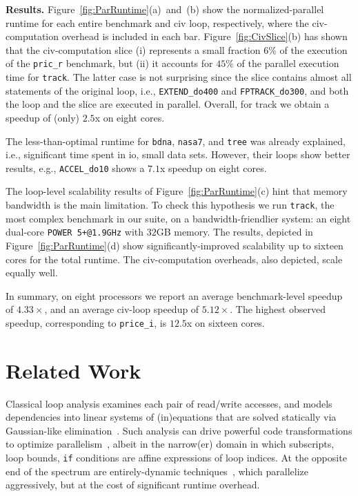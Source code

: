 \documentclass[10pt,nocopyrightspace]{sigplanconf}
\begin{document}
\vspace{1ex}

{\bf Results.} Figure~\ref{fig:ParRuntime}(a)~and~(b) show
the normalized-parallel runtime for each entire benchmark 
and {\sc civ} loop, respectively, where the {\sc civ}-computation
overhead is included in each bar.
%
Figure~\ref{fig:CivSlice}(b) has shown that the {\sc civ}-computation slice 
(i) represents a small fraction $6\%$ of the execution of the 
{\tt pric\_r} benchmark,
but (ii) it accounts for $45\%$ of the parallel execution time for {\tt track}.
The latter case is not surprising since the slice contains almost all statements 
of the original loop, i.e., {\tt EXTEND\_do400} and {\tt FPTRACK\_do300}, 
and both the loop and the slice are executed in parallel.    
Overall, for track we obtain a speedup of (only) $2.5$x on eight cores.


The less-than-optimal runtime for {\tt bdna}, {\tt nasa7}, and 
{\tt tree} was already explained, i.e., significant time spent in {\sc io},
small data sets. However, their loops show better results,
e.g., {\tt ACCEL\_do10} shows a  $7.1$x speedup on eight cores. %

The loop-level scalability results of Figure~\ref{fig:ParRuntime}(c) 
hint that memory bandwidth is the main limitation. 
%
To check this hypothesis we run {\tt track}, the most complex benchmark in our suite, 
on a bandwidth-friendlier system: an eight dual-core {\tt POWER 5+@1.9GHz} with $32$GB memory. 
The results, depicted in Figure~\ref{fig:ParRuntime}(d) show 
significantly-improved scalability up to sixteen cores for the 
total runtime. 
The {\sc civ}-computation overheads, also depicted, scale equally well.  
 
In summary, on eight processors we report an average benchmark-level
speedup of $4.33\times$, and an average {\sc civ}-loop speedup of $5.12\times$. 
The highest observed speedup, corresponding to {\tt price\_i}, is $12.5$x 
on sixteen cores.

 
\section{Related Work}  
\label{sec:RelWork}

Classical loop analysis examines each pair of read/write accesses, 
and models dependencies into linear systems of (in)equations that are solved
statically  via Gaussian-like elimination~\cite{BanerjeeIneqTest,FeautrierDataflow}. 
Such analysis  can drive powerful code transformations to optimize 
parallelism~\cite{PolyhedralOpt}, albeit in the narrow(er) domain 
in which subscripts, loop bounds, {\tt if} conditions are affine 
expressions of loop indices. At the opposite end of the spectrum 
are entirely-dynamic techniques~\cite{LRPD,OanceaSetCongrDynAn}, 
which parallelize aggressively, but at the cost of significant runtime overhead.
\end{document}
